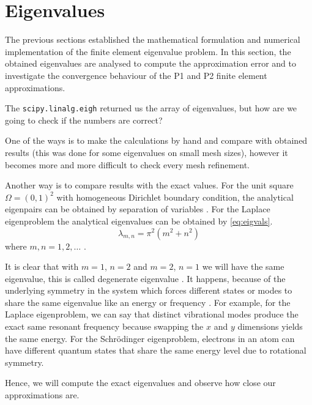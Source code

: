 \documentclass[acmsmall,screen]{MapleTrans}
\begin{document}
\section{Eigenvalues}
The previous sections established the mathematical formulation and numerical implementation of the finite element eigenvalue problem. In this section, the obtained eigenvalues are analysed to compute the approximation error and to investigate the convergence behaviour of the P1 and P2 finite element approximations.

The \texttt{scipy.linalg.eigh} returned us the array of eigenvalues, but how are we going to check if the numbers are correct? 

One of the ways is to make the calculations by hand and compare with obtained results (this was done for some eigenvalues on small mesh sizes), however it becomes more and more difficult to check every mesh refinement.

Another way is to compare results with the exact values. For the unit square $\Omega = (0, 1)^2$ with homogeneous Dirichlet boundary condition, the analytical eigenpairs can be obtained by separation of variables \cite{b12.1,b24}. For the Laplace eigenproblem the analytical eigenvalues can be obtained by \eqref{eq:eigvals}.
\begin{equation}
    \lambda_{m,n} = \pi^2(m^2 + n^2)
    \label{eq:eigvals}
\end{equation}
where $m, n = 1, 2, \ldots$ \cite{b24}.

It is clear that with $m=1$, $n=2$ and $m=2$, $n=1$ we will have the same eigenvalue, this is called degenerate eigenvalue \cite{b12.4,b24}. It happens, because of the underlying symmetry in the system which forces different states or modes to share the same eigenvalue like an energy or frequency \cite{b25}. For example, for the Laplace eigenproblem, we can say that distinct vibrational modes produce the exact same resonant frequency because swapping the $x$ and $y$ dimensions yields the same energy.
For the Schr\"{o}dinger eigenproblem, electrons in an atom can have different quantum states that share the same energy level due to rotational symmetry.

Hence, we will compute the exact eigenvalues and observe how close our approximations are.
\end{document}
